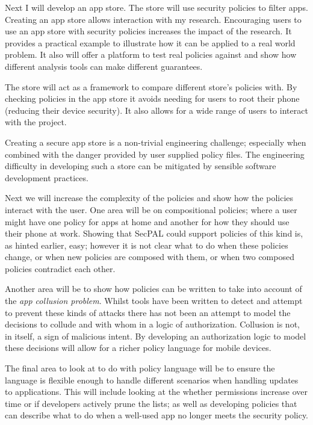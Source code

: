 \documentclass[a4paper,sfsidenotes]{tufte-book}
\begin{document}
Next I will develop an app store.  The store will use security policies to
filter apps.
Creating an app store allows interaction with my research.
Encouraging users to use an app store with security policies
increases the impact of the research. It provides a practical example to illustrate
how it can be applied to a real world problem.  It also will offer a platform to
test real policies against and show how different analysis tools can make
different guarantees.  

The store will act as a framework to compare different store's
policies with.  By checking policies in the app store it avoids
needing for users to root their phone (reducing their device security).
It also allows for a wide range of users to interact with the project. 

Creating a secure app store is a non-trivial engineering challenge; especially
when combined with the danger provided by user supplied policy files. The
engineering difficulty in developing such a store can be mitigated by sensible
software development practices. 

Next we will  increase the complexity of the
policies and show how the policies interact with the user.  One area will be
on compositional policies; where a user might have one policy for apps at home
and another for how they should use their phone at work.  Showing that SecPAL
could support policies of this kind is, as hinted earlier, easy; however it is
not clear what to do when these policies change, or when new policies are
composed with them, or when two composed policies contradict each other.

Another area  will be to show how policies can be written to take into
account of the \emph{app collusion problem}.  Whilst tools have been written to
detect and attempt to prevent these kinds of attacks there has not been an
attempt to model the decisions to collude and with whom in a logic of
authorization.  Collusion is not, in itself, a sign of malicious intent.  By
developing an authorization logic to model these decisions will allow for a
richer policy language for mobile devices.

The final area to look at to do with policy language will be to ensure the language
is flexible enough to handle different scenarios when handling updates to
applications.  This will include looking at the whether permissions increase
over time or if developers actively prune the lists; as well as developing
policies that can describe what to do when a well-used app no longer meets the
security policy.
\end{document}
